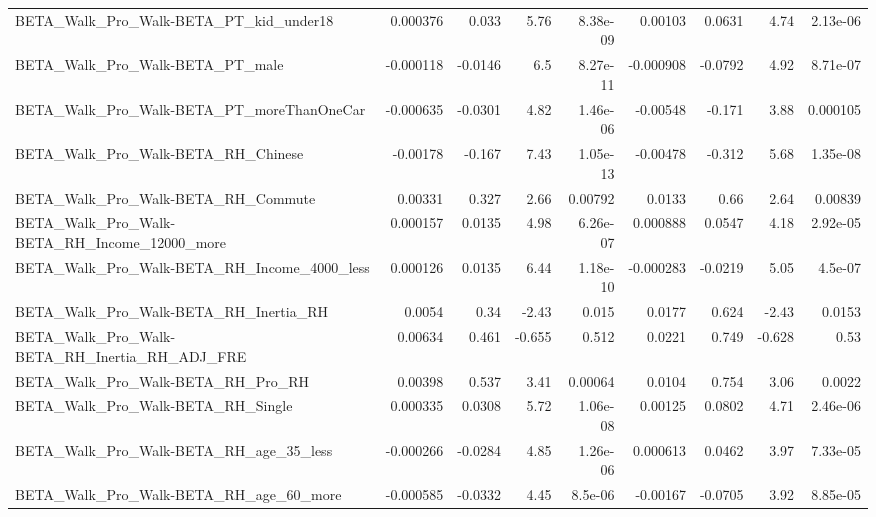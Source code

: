 \begin{tabular}{lrrrrrrrr}
BETA\_Walk\_Pro\_Walk-BETA\_PT\_kid\_under18             &    0.000376 &        0.033 &     5.76 & 8.38e-09 &    0.00103 &      0.0631 &         4.74 &      2.13e-06 \\
BETA\_Walk\_Pro\_Walk-BETA\_PT\_male                    &   -0.000118 &      -0.0146 &      6.5 & 8.27e-11 &  -0.000908 &     -0.0792 &         4.92 &      8.71e-07 \\
BETA\_Walk\_Pro\_Walk-BETA\_PT\_moreThanOneCar          &   -0.000635 &      -0.0301 &     4.82 & 1.46e-06 &   -0.00548 &      -0.171 &         3.88 &      0.000105 \\
BETA\_Walk\_Pro\_Walk-BETA\_RH\_Chinese                 &    -0.00178 &       -0.167 &     7.43 & 1.05e-13 &   -0.00478 &      -0.312 &         5.68 &      1.35e-08 \\
BETA\_Walk\_Pro\_Walk-BETA\_RH\_Commute                 &     0.00331 &        0.327 &     2.66 &  0.00792 &     0.0133 &        0.66 &         2.64 &       0.00839 \\
BETA\_Walk\_Pro\_Walk-BETA\_RH\_Income\_12000\_more       &    0.000157 &       0.0135 &     4.98 & 6.26e-07 &   0.000888 &      0.0547 &         4.18 &      2.92e-05 \\
BETA\_Walk\_Pro\_Walk-BETA\_RH\_Income\_4000\_less        &    0.000126 &       0.0135 &     6.44 & 1.18e-10 &  -0.000283 &     -0.0219 &         5.05 &       4.5e-07 \\
BETA\_Walk\_Pro\_Walk-BETA\_RH\_Inertia\_RH              &      0.0054 &         0.34 &    -2.43 &    0.015 &     0.0177 &       0.624 &        -2.43 &        0.0153 \\
BETA\_Walk\_Pro\_Walk-BETA\_RH\_Inertia\_RH\_ADJ\_FRE      &     0.00634 &        0.461 &   -0.655 &    0.512 &     0.0221 &       0.749 &       -0.628 &          0.53 \\
BETA\_Walk\_Pro\_Walk-BETA\_RH\_Pro\_RH                  &     0.00398 &        0.537 &     3.41 &  0.00064 &     0.0104 &       0.754 &         3.06 &        0.0022 \\
BETA\_Walk\_Pro\_Walk-BETA\_RH\_Single                  &    0.000335 &       0.0308 &     5.72 & 1.06e-08 &    0.00125 &      0.0802 &         4.71 &      2.46e-06 \\
BETA\_Walk\_Pro\_Walk-BETA\_RH\_age\_35\_less             &   -0.000266 &      -0.0284 &     4.85 & 1.26e-06 &   0.000613 &      0.0462 &         3.97 &      7.33e-05 \\
BETA\_Walk\_Pro\_Walk-BETA\_RH\_age\_60\_more             &   -0.000585 &      -0.0332 &     4.45 &  8.5e-06 &   -0.00167 &     -0.0705 &         3.92 &      8.85e-05 \\

\end{tabular}
